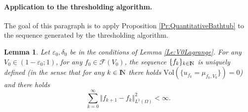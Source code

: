 \documentclass{article}
\newcommand{\N}{\textnormal{I\kern-0.21emN}}
\def\e{{\varepsilon}}
\newtheorem{lemma}[material]{Lemma}
\def\O{{\Omega}}
\numberwithin{equation}{section}
\begin{document}
\paragraph{Application to the thresholding algorithm.}
The goal of this paragraph is to apply Proposition \ref{Pr:QuantitativeBathtub} to the sequence generated by the thresholding algorithm.
\begin{lemma}\label{Le:QuantitativeBathtubThresholding}
Let $\e_0,\delta_0$ be in the conditions of Lemma \ref{Le:V0Lagrange}. For any $V_0\in (1-\e_0;1)$, for any $f_0\in \mathcal F(V_0)$, the sequence $\{f_k\}_{k\in \N}$ is uniquely defined (in the sense that for any $k\in \N$ there holds $\mathrm{Vol}\left(\{u_{f_k}=\mu_{f_k,V_0}\}\right)=0$) and there holds
\begin{equation}
\sum_{k=0}^\infty \Vert f_{k+1}-f_k\Vert_{L^1(\O)}^2<\infty.
\end{equation}
\end{lemma}
\end{document}
